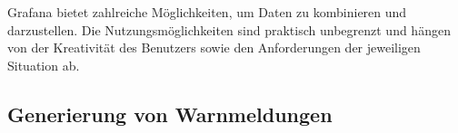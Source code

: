 Grafana bietet zahlreiche Möglichkeiten, um Daten zu kombinieren und darzustellen. Die Nutzungsmöglichkeiten sind praktisch unbegrenzt und hängen von der Kreativität des Benutzers sowie den Anforderungen der jeweiligen Situation ab.

\subsection{Generierung von Warnmeldungen}



